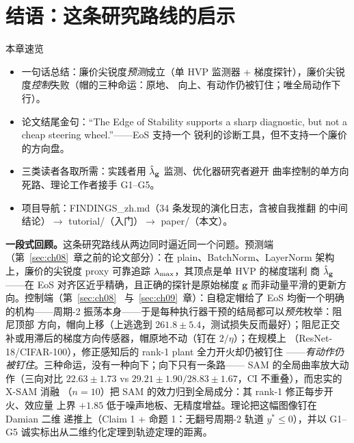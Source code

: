 
\section{结语：这条研究路线的启示}\label{sec:ch11}

\begin{keybox}{本章速览}
\begin{itemize}
  \item 一句话总结：廉价尖锐度\emph{预测}成立（单 HVP 监测器 +
        梯度探针），廉价尖锐度\emph{控制}失败（帽的三种命运：原地、
        向上、有动作仍被钉住；唯全局动作下行）。
  \item 论文结尾金句：“The Edge of Stability supports a sharp
        diagnostic, but not a cheap steering wheel.”——EoS 支持一个
        锐利的诊断工具，但不支持一个廉价的方向盘。
  \item 三类读者各取所需：实践者用 $\hat{\lambda}_{\mathbf{g}}$ 监测、优化器研究者避开
        曲率控制的单方向死路、理论工作者接手 G1--G5。
  \item 项目导航：FINDINGS\_zh.md（34 条发现的演化日志，含被自我推翻
        的中间结论）$\to$ tutorial/（入门）$\to$ paper/（本文）。
\end{itemize}
\end{keybox}

\textbf{一段式回顾。}这条研究路线从两边同时逼近同一个问题。预测端
（第~\ref{sec:ch08}~章之前的论文部分）：在 plain、BatchNorm、LayerNorm
架构上，廉价的尖锐度 proxy 可靠追踪 $\lambda_{\max}$，其顶点是单 HVP 的梯度瑞利
商 $\hat{\lambda}_{\mathbf{g}}$——在 EoS 对齐区近乎精确，且正确的探针是原始梯度
$\mathbf{g}$ 而非动量平滑的更新方向。控制端（第~\ref{sec:ch08}~
与~\ref{sec:ch09}~章）：自稳定帽给了 EoS 均衡一个明确的机构——周期-2
振荡本身——于是每种执行器干预的结局都可以\emph{预先}枚举：阻尼顶部
方向，帽向上移（上逃逸到 $261.8\pm5.4$，测试损失反而最好）；阻尼正交
补或用滞后的梯度方向传感器，帽原地不动（钉在 $2/\eta$）；在规模上
（ResNet-18/CIFAR-100），修正感知后的 rank-1 plant 全力开火却仍被钉住
——\emph{有动作仍被钉住}。三种命运，没有一种向下；向下只有一条路——
SAM 的全局曲率放大动作（三向对比 $22.63\pm1.73$ vs
$29.21\pm1.90/28.83\pm1.67$，CI 不重叠），而忠实的 X-SAM 消融
（$n=10$）把 SAM 的效力归到全局成分：其 rank-1 修正每步开火、效应量
上界 $+1.85$ 低于噪声地板、无精度增益。理论把这幅图像钉在 Damian 二维
递推上（Claim 1 + 命题 1：无翻号周期-2 轨道 $y^{*}\le0$），并以
G1--G5 诚实标出从二维约化定理到轨迹定理的距离。

